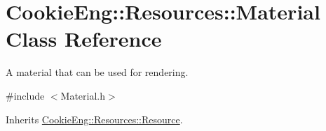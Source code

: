 \hypertarget{class_cookie_eng_1_1_resources_1_1_material}{}\section{Cookie\+Eng\+:\+:Resources\+:\+:Material Class Reference}
\label{class_cookie_eng_1_1_resources_1_1_material}


A material that can be used for rendering.  




{\ttfamily \#include $<$Material.\+h$>$}



Inherits \hyperlink{class_cookie_eng_1_1_resources_1_1_resource}{Cookie\+Eng\+::\+Resources\+::\+Resource}.

